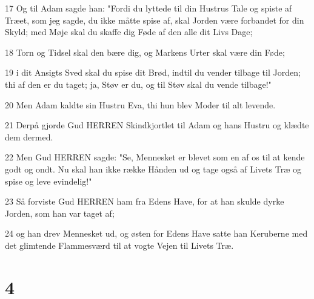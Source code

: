 \par 17 Og til Adam sagde han: "Fordi du lyttede til din Hustrus Tale og spiste af Træet, som jeg sagde, du ikke måtte spise af, skal Jorden være forbandet for din Skyld; med Møje skal du skaffe dig Føde af den alle dit Livs Dage;
\par 18 Torn og Tidsel skal den bære dig, og Markens Urter skal være din Føde;
\par 19 i dit Ansigts Sved skal du spise dit Brød, indtil du vender tilbage til Jorden; thi af den er du taget; ja, Støv er du, og til Støv skal du vende tilbage!"
\par 20 Men Adam kaldte sin Hustru Eva, thi hun blev Moder til alt levende.
\par 21 Derpå gjorde Gud HERREN Skindkjortlet til Adam og hans Hustru og klædte dem dermed.
\par 22 Men Gud HERREN sagde: "Se, Mennesket er blevet som en af os til at kende godt og ondt. Nu skal han ikke række Hånden ud og tage også af Livets Træ og spise og leve evindelig!"
\par 23 Så forviste Gud HERREN ham fra Edens Have, for at han skulde dyrke Jorden, som han var taget af;
\par 24 og han drev Mennesket ud, og østen for Edens Have satte han Keruberne med det glimtende Flammesværd til at vogte Vejen til Livets Træ.

\chapter{4}

